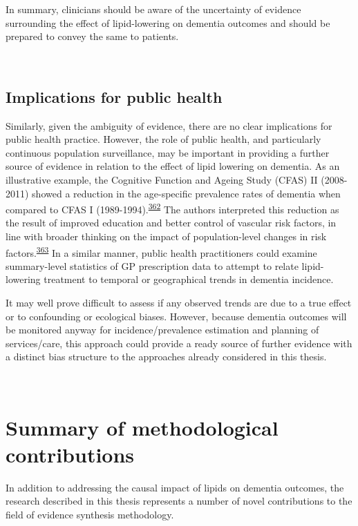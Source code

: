 \documentclass[a4paper, twoside]{templates/ociamthesis}
\begin{document}
In summary, clinicians should be aware of the uncertainty of evidence surrounding the effect of lipid-lowering on dementia outcomes and should be prepared to convey the same to patients.

~

\hypertarget{implications-for-public-health}{%
\subsection{Implications for public health}\label{implications-for-public-health}}

Similarly, given the ambiguity of evidence, there are no clear implications for public health practice. However, the role of public health, and particularly continuous population surveillance, may be important in providing a further source of evidence in relation to the effect of lipid lowering on dementia. As an illustrative example, the Cognitive Function and Ageing Study (CFAS) II (2008-2011) showed a reduction in the age-specific prevalence rates of dementia when compared to CFAS I (1989-1994).\textsuperscript{\protect\hyperlink{ref-matthews2013}{362}} The authors interpreted this reduction as the result of improved education and better control of vascular risk factors, in line with broader thinking on the impact of population-level changes in risk factors.\textsuperscript{\protect\hyperlink{ref-capewell2011}{363}} In a similar manner, public health practitioners could examine summary-level statistics of GP prescription data to attempt to relate lipid-lowering treatment to temporal or geographical trends in dementia incidence.

It may well prove difficult to assess if any observed trends are due to a true effect or to confounding or ecological biases. However, because dementia outcomes will be monitored anyway for incidence/prevalence estimation and planning of services/care, this approach could provide a ready source of further evidence with a distinct bias structure to the approaches already considered in this thesis.

~

\hypertarget{summary-of-methodological-contributions}{%
\section{Summary of methodological contributions}\label{summary-of-methodological-contributions}}

In addition to addressing the causal impact of lipids on dementia outcomes, the research described in this thesis represents a number of novel contributions to the field of evidence synthesis methodology.
\end{document}
